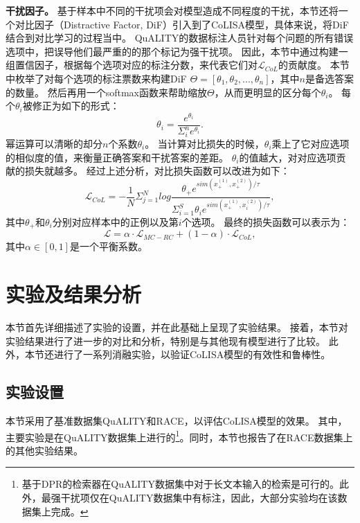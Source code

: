 \textbf{干扰因子。}
基于样本中不同的干扰项会对模型造成不同程度的干扰，本节还将一个对比因子（Distractive Factor, DiF）引入到了CoLISA模型，具体来说，将DiF结合到对比学习的过程当中。
QuALITY的数据标注人员针对每个问题的所有错误选项中，把误导他们最严重的的那个标记为强干扰项。
因此，本节中通过构建一组置信因子，根据每个选项对应的标注分数，来代表它们对$\mathcal L_{CoL}$的贡献度。
本节中枚举了对每个选项的标注票数来构建DiF $\Theta=[\theta_1, \theta_2, ..., \theta_n]$，其中$n$是备选答案的数量。
然后再用一个softmax函数来帮助缩放$\Theta$，从而更明显的区分每个$\theta_i$。
每个$\theta_i$被修正为如下的形式：
\begin{equation}
    \theta_i=\frac{e^{\theta_i}}{\Sigma^n_i e^{\theta_i}}.
\end{equation}
幂运算可以清晰的却分$n$个系数$\theta_i$。
当计算对比损失的时候，$\theta_i$乘上了它对应选项的相似度的值，来衡量正确答案和干扰答案的差距。
$\theta_i$的值越大，对对应选项贡献的损失就越多。
经过上述分析，对比损失函数可以改进为如下：
\begin{equation}
    \mathcal L_{CoL}=-\frac{1}{N}\Sigma^N_{j=1}log \frac{\theta_+e^{sim(x^{(1)}_+,x^{(2)}_+)/ \tau}}{\Sigma^S_{i=1} \theta_ie^{sim(x^{(1)}_+,x^{(2)}_i)/ \tau}},
\end{equation}
其中$\theta_+$和$\theta_i$分别对应样本中的正例以及第$i$个选项。
最终的损失函数可以表示为：
\begin{equation}
    \mathcal L=\alpha \cdot \mathcal L_{MC-RC}+(1-\alpha) \cdot \mathcal L_{CoL},
\end{equation}
其中$\alpha \in[0,1]$是一个平衡系数。


\section{实验及结果分析}
本节首先详细描述了实验的设置，并在此基础上呈现了实验结果。
接着，本节对实验结果进行了进一步的对比和分析，特别是与其他现有模型进行了比较。
此外，本节还进行了一系列消融实验，以验证CoLISA模型的有效性和鲁棒性。

\subsection{实验设置}
本节采用了基准数据集QuALITY和RACE，以评估CoLISA模型的效果。
其中，主要实验是在QuALITY数据集上进行的\footnote{基于DPR的检索器在QuALITY数据集中对于长文本输入的检索是可行的。此外，最强干扰项仅在QuALITY数据集中有标注，因此，大部分实验均在该数据集上完成。}。同时，本节也报告了在RACE数据集上的其他实验结果。


